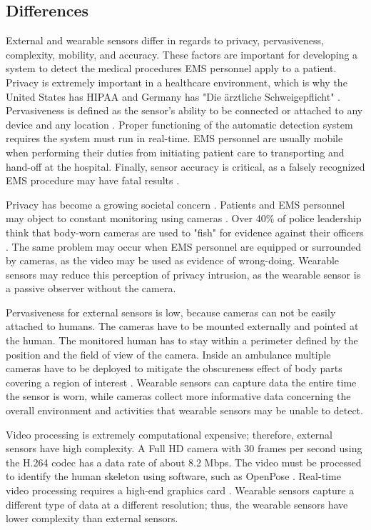 \subsection{Differences}
External and wearable sensors differ in regards to privacy, pervasiveness, complexity, mobility, and accuracy. These factors are important for developing a system to detect the medical procedures EMS personnel apply to a patient. Privacy is extremely important in a healthcare environment, which is why the United States has HIPAA \cite{HIPAA} and Germany has "Die \"arztliche Schweigepflicht" \cite{Privatgeheimnissen}. Pervasiveness is defined as the sensor's ability to be connected or attached to any device and any location \cite{Lara2013}. Proper functioning of the automatic detection system requires the system must run in real-time. EMS personnel are usually mobile when performing their duties from initiating patient care to transporting and hand-off at the hospital. Finally, sensor accuracy is critical, as a falsely recognized EMS procedure may have fatal results \cite{mourcou2015performance}.
\par Privacy has become a growing societal concern \cite{privacyindex}. Patients and EMS personnel may object to constant monitoring using cameras \cite{Arning2015}. Over 40\% of police leadership think that body-worn cameras are used to "fish" for evidence against their officers \cite{Smykla2016}. The same problem may occur when EMS personnel are equipped or surrounded by cameras, as the video may be used as evidence of wrong-doing. Wearable sensors may reduce this perception of privacy intrusion, as the wearable sensor is a passive observer without the camera.
\par Pervasiveness for external sensors is low, because cameras can not be easily attached to humans. The cameras have to be mounted externally and pointed at the human. The monitored human has to stay within a perimeter defined by the position and the field of view of the camera. Inside an ambulance multiple cameras have to be deployed to mitigate the obscureness effect of body parts covering a region of interest \cite{howe2000bayesian}. Wearable sensors can capture data the entire time the sensor is worn, while cameras collect more informative data concerning the overall environment and activities that wearable sensors may be unable to detect.
\par Video processing is extremely computational expensive; therefore, external sensors have high complexity. A Full HD camera with 30 frames per second using the H.264 codec has a data rate of about 8.2 Mbps. The video must be processed to identify the human skeleton using software, such as OpenPose \cite{openpose}. Real-time video processing requires a high-end graphics card \cite{732851}. Wearable sensors capture a different type of data at a different resolution; thus, the wearable sensors have lower complexity than external sensors.
